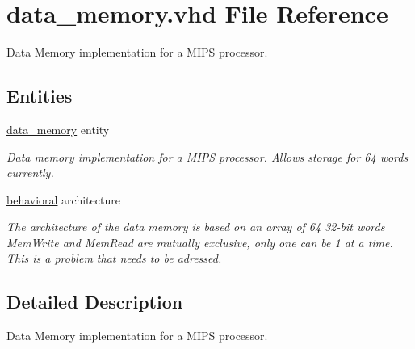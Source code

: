 \hypertarget{data__memory_8vhd}{\section{data\-\_\-memory.\-vhd \-File \-Reference}
\label{data__memory_8vhd}
}


\-Data \-Memory implementation for a \-M\-I\-P\-S processor.  


\subsection*{\-Entities}
\begin{DoxyCompactItemize}
\item 
\hyperlink{classdata__memory}{data\-\_\-memory} entity
\begin{DoxyCompactList}\small\item\em \-Data memory implementation for a \-M\-I\-P\-S processor. \-Allows storage for 64 words currently. \end{DoxyCompactList}\item 
\hyperlink{classdata__memory_1_1behavioral}{behavioral} architecture
\begin{DoxyCompactList}\small\item\em \-The architecture of the data memory is based on an array of 64 32-\/bit words  \-Mem\-Write and \-Mem\-Read are mutually exclusive, only one can be 1 at a time. \-This is a problem that needs to be adressed. \end{DoxyCompactList}\end{DoxyCompactItemize}


\subsection{\-Detailed \-Description}
\-Data \-Memory implementation for a \-M\-I\-P\-S processor. 